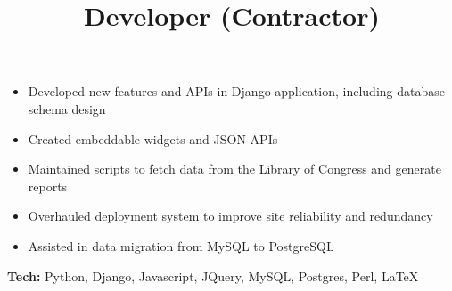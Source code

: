         \title{Developer (Contractor)}
        \begin{position}
        	\vspace{-12pt}\begin{itemize}
				\item Developed new features and APIs in Django application, including database schema design
				\item Created embeddable widgets and JSON APIs
				\item Maintained scripts to fetch data from the Library of Congress and generate reports
				\item Overhauled deployment system to improve site reliability and redundancy
				\item Assisted in data migration from MySQL to PostgreSQL
			\end{itemize}
			\textbf{Tech:} Python, Django, Javascript, JQuery, MySQL, Postgres, Perl, \LaTeX
        \end{position}
        

